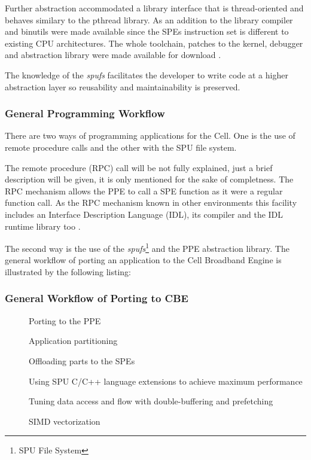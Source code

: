 \documentclass[DIV10, abstracton, openright, footsepline, headsepline, twoside, 9pt,
bigheadings]{scrreprt}
\begin{document}
Further abstraction accommodated a library interface that is thread-oriented
and behaves similary to the pthread library. As an addition to the library
compiler and binutils were made available since the SPEs instruction set is
different to existing CPU architectures. The whole toolchain, patches to the
kernel, debugger and abstraction library were made available for download
\cite{Bsc06}.

The knowledge of the \textit{spufs} facilitates the developer to write code
at a higher abstraction layer so reusability and maintainability is preserved.

\subsubsection{General Programming Workflow}
There are two ways of programming applications for the Cell. One is the use of
remote procedure calls and the other with the SPU file system.

The remote procedure (RPC) call will be not fully explained, just a brief description will be given, it is only mentioned for the sake of completness. The RPC mechanism allows the PPE to call a SPE function as it were a regular function call. As the RPC mechanism known in other environments this facility includes an Interface Description Language (IDL), its compiler and the IDL runtime library too \cite{STI05}.

The second way is the use of the \textit{spufs}\footnote{SPU File System} and
the PPE abstraction library. The general workflow of porting an application to
the Cell Broadband Engine is illustrated by the following listing:
\subsubsection*{General Workflow of Porting to CBE}
\begin{description}
\item [\color{Bigblue}{\color{Bigblue}{$\triangleright$}}] Porting to the PPE
\item [\color{Bigblue}{\color{Bigblue}{$\triangleright$}}] Application partitioning
\item [\color{Bigblue}{\color{Bigblue}{$\triangleright$}}] Offloading parts to the SPEs
\item [\color{Bigblue}{\color{Bigblue}{$\triangleright$}}] Using SPU C/C++ language extensions to achieve maximum performance
\item [\color{Bigblue}{\color{Bigblue}{$\triangleright$}}] Tuning data access and flow with double-buffering and
prefetching
\item [\color{Bigblue}{\color{Bigblue}{$\triangleright$}}] SIMD vectorization
\end{description}
\end{document}
